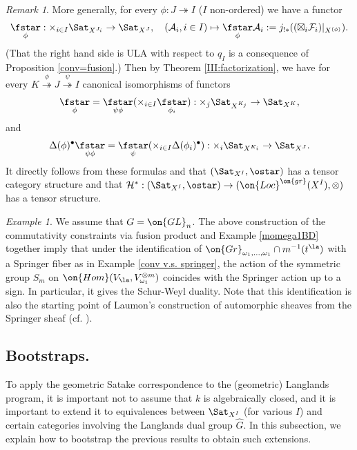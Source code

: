 \documentclass[]{pcmi}
\theoremstyle{plain}
\theoremstyle{remark}
\newtheorem{ex}[equation]{Example}
\newtheorem{rmk}[equation]{Remark}
\theoremstyle{definition}
\newcommand{\mA}{{\mathcal A}}
\newcommand{\mF}{{\mathcal F}}
\newcommand{\mH}{{\mathcal H}}
\newcommand{\Gr}{{\on{Gr}}}
\newcommand{\Hom}{{\on{Hom}}}
\newcommand{\GL}{{\on{GL}}}
\begin{document}
\begin{rmk}\label{symmetry on fusion}
More generally, for every $\phi: J\twoheadrightarrow I$ ($I$ non-ordered) we have a functor
\[\underset{\phi}{\fstar}: \times_{i\in I}\Sat_{X^{J_i}}\to \Sat_{X^J},\quad ( \mA_{i}, i\in I)\mapsto \underset{\phi}{\fstar}\mA_i:=j_{!*}((\boxtimes_i \mF_i)|_{X^{(\phi)}}).\]
(That the right hand side is ULA with respect to $q_I$ is a consequence of Proposition \ref{conv=fusion}.) Then by Theorem \ref{III:factorization}, we have
for every $K\stackrel{\phi}{\twoheadrightarrow} J\stackrel{\psi}{\twoheadrightarrow} I$ canonical isomorphisms of functors
\begin{equation}\label{fusion prod}
\underset{\phi}{\fstar}= \underset{\psi\phi}{\fstar}(\times_{i\in I} \underset{\phi_i}{\fstar}): \times_{j} \Sat_{X^{K_j}}\to \Sat_{X^K},
\end{equation}
and
\begin{equation}
\Delta(\phi)^\bullet \underset{\psi\phi}{\fstar}= \underset{\psi}{\fstar}(\times_{i\in I}\Delta(\phi_i)^\bullet): \times_{i}\Sat_{X^{K_i}}\to \Sat_{X^J}.
\end{equation}
It directly follows from these formulas and \cite[Proposition 1.5]{DM} that $(\Sat_{X^I},\ostar)$ has a tensor category structure and that $\mH^*: (\Sat_{X^I},\ostar)\to (\on{Loc}^{\on{gr}}(X^I),\otimes)$ has a tensor structure.
\end{rmk}

\begin{ex}
We assume that $G=\GL_n$. The above construction of the commutativity constraints via fusion product and Example \ref{momega1BD} together imply 
that under the identification of $\Gr_{\omega_1,\ldots,\omega_1}\cap m^{-1}(t^\la)$ with a Springer fiber as in Example \ref{conv v.s. springer}, 
the action of the symmetric group $S_m$ on $\Hom(V_\la, V_{\omega_1}^{\otimes m})$ coincides with the Springer action up to a sign. In particular, it gives the Schur-Weyl duality.
Note that this identification is also the starting point of Laumon's construction of automorphic sheaves from the Springer sheaf (cf. \cite{FGKV}).
\end{ex}



\subsection{Bootstraps.}
To apply the geometric Satake correspondence to the (geometric) Langlands program, it is important not to assume that $k$ is algebraically closed, and it is important to extend it to equivalences between
$\Sat_{X^I}$ (for various $I$) and certain categories involving the Langlands dual group $\hat G$. 
In this subsection, we explain how to bootstrap the previous results to obtain such extensions. 
\end{document}
